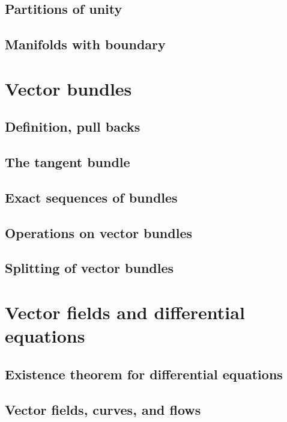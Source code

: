 \documentclass[a4paper]{article}
\begin{document}
\subsection{Partitions of unity}

\subsection{Manifolds with boundary}

\section{Vector bundles}

\subsection{Definition, pull backs}

\subsection{The tangent bundle}

\subsection{Exact sequences of bundles}

\subsection{Operations on vector bundles}

\subsection{Splitting of vector bundles}

\section{Vector fields and differential equations}

\subsection{Existence theorem for differential equations}

\subsection{Vector fields, curves, and flows}
\end{document}

